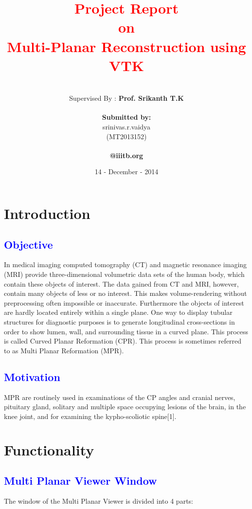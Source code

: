 \documentclass[12pt]{report}
\title{\textbf{ \textcolor{red}{Project Report \\ on \\Multi-Planar Reconstruction using VTK } }}
\author{
\vspace{ 2 mm}\\
Supervised By : \textbf{Prof. Srikanth T.K}\\
\vspace {2mm}\\
\textbf{Submitted by:} \\
srinivas.r.vaidya\\
(MT2013152) \\
\vspace{ -2 mm}\\	
\textbf{@iiitb.org}}
\date{14 - December - 2014}
\begin{document}
\maketitle

\tableofcontents

\vspace{ 100 mm}
\chapter{Introduction}
\section{\textcolor{blue}{Objective} }

In medical imaging computed tomography (CT) and magnetic resonance imaging (MRI) provide three-dimensional volumetric data sets of the human body, which contain these objects of interest. The data gained from CT and MRI, however, contain many objects of less or no interest. This makes volume-rendering without preprocessing often impossible or inaccurate. Furthermore the objects of interest are hardly located entirely within a single plane. One way to display tubular structures for diagnostic purposes is to generate longitudinal cross-sections in order to show lumen, wall, and surrounding tissue in a curved plane. This process is called Curved Planar Reformation (CPR). This process is sometimes referred to as Multi Planar Reformation (MPR).

\section{\textcolor{blue}{Motivation} }

MPR are routinely used in examinations of the CP angles and cranial nerves, pituitary gland, solitary and multiple space occupying lesions of the brain, in the knee joint, and for examining the kypho-scoliotic spine[1]. 

\chapter{Functionality}
\section{\textcolor{blue}{Multi Planar Viewer Window} }

The window of the Multi Planar Viewer is divided into 4 parts: \\
\end{document}
